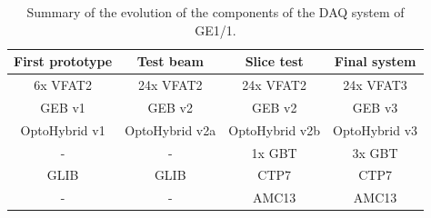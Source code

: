     \begin{table}
      \begin{tabularx}{\textwidth}{C{1}C{1}C{1}C{1}}
        \textbf{First prototype} & \textbf{Test beam}   & \textbf{Slice test}  & \textbf{Final system} \\ \hline
        6x VFAT2        & 24x VFAT2       & 24x VFAT2       & 24x VFAT3 \\
        GEB v1          & GEB v2          & GEB v2          & GEB v3 \\
        OptoHybrid v1   & OptoHybrid v2a  & OptoHybrid v2b  & OptoHybrid v3 \\
        -               & -               & 1x GBT          & 3x GBT \\
        GLIB            & GLIB            & CTP7            & CTP7 \\
        -               & -               & AMC13           & AMC13 \\
      \end{tabularx}
      \caption{Summary of the evolution of the components of the DAQ system of GE1/1.}
      \label{tab:II-2-summary}
    \end{table}
